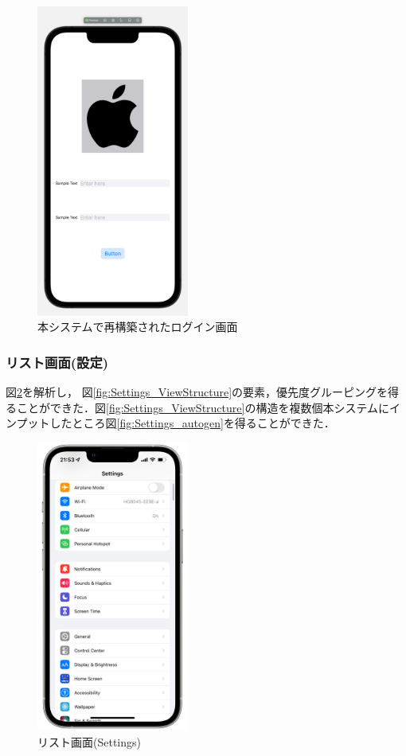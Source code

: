 \begin{figure}[htbp]
  \begin{minipage}{\hsize}
    \begin{center}
       \includegraphics[width=50mm]{img/wave_autogen.png}
    \end{center}
    \caption{本システムで再構築されたログイン画面}
    \label{fig:wave_autogen}
  \end{minipage}
\end{figure}

\subsubsection{リスト画面(設定)}
図\ref{fig:Settings_screenshot}を解析し， 図\ref{fig:Settings_ViewStructure}の要素，優先度グルーピングを得ることができた．図\ref{fig:Settings_ViewStructure}の構造を複数個本システムにインプットしたところ図\ref{fig:Settings_autogen}を得ることができた．

\begin{figure}[htbp]
  \begin{minipage}{\hsize}
    \begin{center}
       \includegraphics[width=50mm]{img/Settings_screenshot.png}
    \end{center}
    \caption{リスト画面(Settings)}
    \label{fig:Settings_screenshot}
  \end{minipage}
\end{figure}

